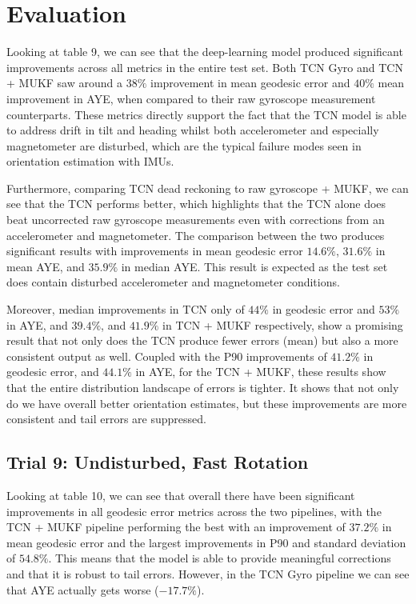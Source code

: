 \clearpage
\section{Evaluation}
Looking at table 9, we can see that the deep-learning model produced significant improvements across all metrics in the 
entire test set. Both TCN Gyro and TCN + MUKF saw around a $38\%$ improvement in mean geodesic error and $40\%$ mean improvement in AYE, when compared to their raw 
gyroscope measurement counterparts. These metrics directly support the fact that the TCN model is able to address drift in tilt and heading
whilst both accelerometer and especially magnetometer 
are disturbed, which are the typical failure modes seen in orientation estimation with IMUs.

Furthermore, comparing TCN dead reckoning to raw gyroscope + MUKF, we can see that the TCN performs better, which highlights that 
the TCN alone does beat uncorrected raw gyroscope measurements even with corrections from an accelerometer and magnetometer. The comparison between
the two produces significant results with improvements in mean geodesic error  $14.6\%$, $31.6\%$ in  mean AYE, and $35.9\%$ in median AYE. This result
is expected as the test set does contain disturbed accelerometer and magnetometer conditions. 

Moreover, median improvements in TCN only of $44\%$ in geodesic error and $53\%$ in AYE, and $39.4\%$, and  $41.9\%$ in TCN + MUKF respectively, show 
a promising result that not only does the TCN produce fewer errors (mean) but also a more consistent output as well. Coupled with the P90 improvements of 
$41.2\%$ in geodesic error, and $44.1\%$ in AYE, for the TCN + MUKF, these results show that the entire distribution landscape of errors is tighter. 
It shows that not only do we have overall better orientation estimates, but these improvements are more consistent and tail errors are suppressed. 


\subsection{Trial 9: Undisturbed, Fast Rotation}
Looking at table 10, we can see that overall there have been significant improvements in all geodesic error metrics across the two pipelines, with the 
TCN + MUKF pipeline performing the best with an improvement of $37.2\%$ in mean geodesic error and the largest improvements in P90 and standard deviation of $54.8\%$.
This means that the model is able to provide meaningful corrections and that it is robust to tail errors. However, in the TCN Gyro pipeline we can see that
AYE actually gets worse ($-17.7\%$). 

